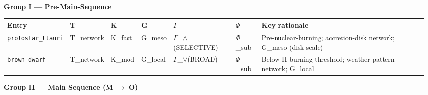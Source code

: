 \documentclass[12pt,a4paper]{article}
\begin{document}
\textbf{Group I --- Pre-Main-Sequence}

\begin{table}[htbp]
\centering
\small
{}
\begin{tabularx}{\textwidth}{>{\centering\arraybackslash}X >{\centering\arraybackslash}X >{\centering\arraybackslash}X >{\centering\arraybackslash}X >{\centering\arraybackslash}X >{\centering\arraybackslash}X >{\centering\arraybackslash}X}
\toprule
\rowcolor{gray!25}\textbf{Entry} & \textbf{T} & \textbf{K} & \textbf{G} & \textbf{$\Gamma$} & \textbf{$\Phi$} & \textbf{Key rationale} \\
\midrule
\rowcolors{1}{white}{gray!10}
\texttt{protostar\_ttauri} & T\_network & K\_fast & G\_meso & $\Gamma$\_$\land$(SELECTIVE) & $\Phi$\_sub & Pre-nuclear-burning; accretion-disk network; G\_meso (disk scale) \\
\texttt{brown\_dwarf} & T\_network & K\_mod & G\_local & $\Gamma$\_$\lor$(BROAD) & $\Phi$\_sub & Below H-burning threshold; weather-pattern network; G\_local \\
\bottomrule
\end{tabularx}
\end{table}

\textbf{Group II --- Main Sequence (M $\rightarrow$ O)}
\end{document}
